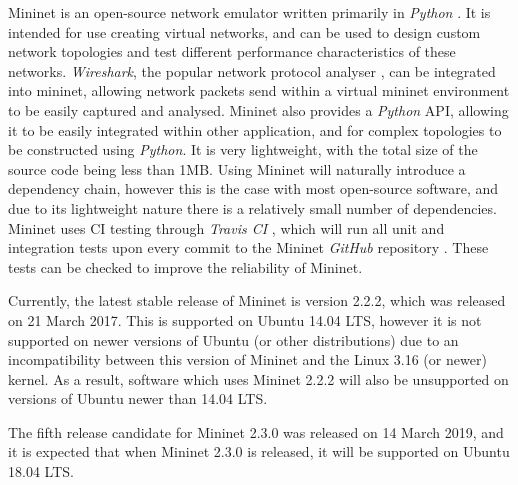 

Mininet is an open-source network emulator written primarily in \textit{Python} \cite{mininet}. It is intended for use creating virtual networks, and can be used to design custom network topologies and test different performance characteristics of these networks.
\textit{Wireshark}, the popular network protocol analyser \cite{wireshark}, can be integrated into mininet, allowing network packets send within a virtual mininet environment to be easily captured and analysed.
Mininet also provides a \textit{Python} API, allowing it to be easily integrated within other application, and for complex topologies to be constructed using \textit{Python}.
It is very lightweight, with the total size of the source code being less than 1MB.
Using Mininet will naturally introduce a dependency chain, however this is the case with most open-source software, and due to its lightweight nature there is a relatively small number of dependencies.
Mininet uses CI testing through \textit{Travis CI} \cite{travis_ci}, which will run all unit and integration tests upon every commit to the Mininet \textit{GitHub} repository \cite{github}. These tests can be checked to improve the reliability of Mininet.

Currently, the latest stable release of Mininet is version 2.2.2, which was released on 21 March 2017. This is supported on Ubuntu 14.04 LTS, however it is not supported on newer versions of Ubuntu (or other distributions) due to an incompatibility between this version of Mininet and the Linux 3.16 (or newer) kernel. As a result, software which uses Mininet 2.2.2 will also be unsupported on versions of Ubuntu newer than 14.04 LTS.

The fifth release candidate for Mininet 2.3.0 was released on 14 March 2019, and it is expected that when Mininet 2.3.0 is released, it will be supported on Ubuntu 18.04 LTS.
